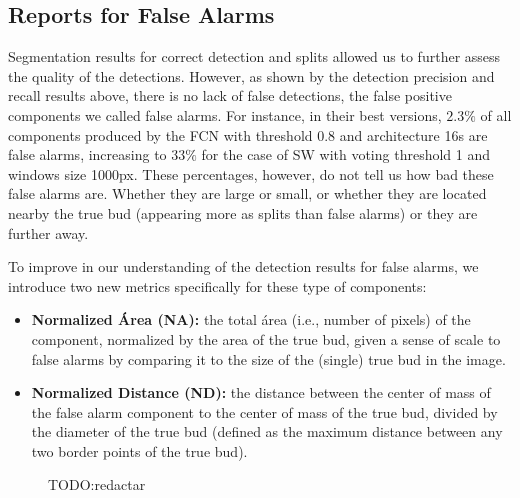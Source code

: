 \documentclass[a4paper,authoryear,review]{elsarticle}
\begin{document}
\subsection{Reports for False Alarms} 
\label{sec:falsealarmsrep}

Segmentation results for correct detection and splits allowed us to further assess the quality of the detections. However, as shown by the detection precision and recall results above, there is no lack of false detections, the false positive components we called false alarms. For instance, in their best versions, $2.3\%$ of all components produced by the FCN with threshold $0.8$ and architecture 16s are false alarms, increasing to $33\%$ for the case of SW with voting threshold 1 and windows size 1000px.  These percentages, however, do not tell us how bad these false alarms are. Whether they are large or small, or whether they are located nearby the true bud (appearing more as splits than false alarms) or they are further away. 

To improve in our understanding of the detection results for false alarms, we introduce two new metrics specifically for these type of components:

\begin{itemize}
	\item \textbf{Normalized Área (NA):} the total área (i.e., number of pixels) of the component, normalized by the area of the true bud, given a sense of scale to false alarms by comparing it to the size of the (single) true bud in the image. 
	\item \textbf{Normalized Distance (ND):}  the distance between the center of mass of the false alarm component to the center of mass of the true bud, divided by the diameter of the true bud (defined as the maximum distance between any two border points of the true bud).
\end{itemize}

\begin{figure}%
	\centering
	\label{fig:mean-FA-a}
	\qquad
	\label{fig:mean-FA-b}
	\caption{TODO:redactar}%
	\label{fig:mean-FA}%
\end{figure}
\end{document}
